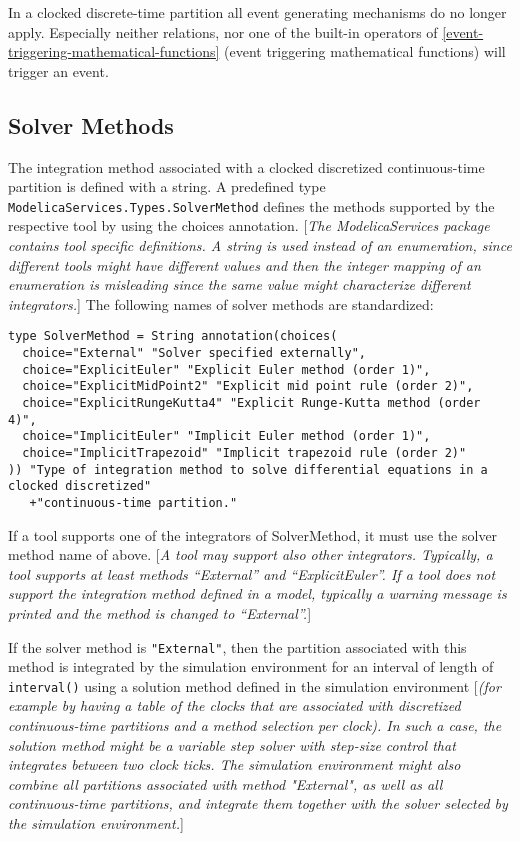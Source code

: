 In a clocked discrete-time partition all event generating mechanisms do
no longer apply. Especially neither relations, nor one of the built-in
operators of \autoref{event-triggering-mathematical-functions} (event triggering mathematical functions)
will trigger an event.

\subsection{Solver Methods}

The integration method associated with a clocked discretized
continuous-time partition is defined with a string. A predefined type
\lstinline[basicstyle=\ttfamily]!ModelicaServices.Types.SolverMethod! defines the methods supported by the
respective tool by using the choices annotation. {[}\emph{The
ModelicaServices package contains tool specific definitions. A string is
used instead of an enumeration, since different tools might have
different values and then the integer mapping of an enumeration is
misleading since the same value might characterize different
integrators.}{]} The following names of solver methods are standardized:

\begin{lstlisting}[language=modelica]
type SolverMethod = String annotation(choices(
  choice="External" "Solver specified externally",
  choice="ExplicitEuler" "Explicit Euler method (order 1)",
  choice="ExplicitMidPoint2" "Explicit mid point rule (order 2)",
  choice="ExplicitRungeKutta4" "Explicit Runge-Kutta method (order 4)",
  choice="ImplicitEuler" "Implicit Euler method (order 1)",
  choice="ImplicitTrapezoid" "Implicit trapezoid rule (order 2)"
)) "Type of integration method to solve differential equations in a clocked discretized"
   +"continuous-time partition."
\end{lstlisting}

If a tool supports one of the integrators of SolverMethod, it must use
the solver method name of above. {[}\emph{A tool may support also other
integrators. Typically, a tool supports at least methods ``External''
and ``ExplicitEuler''. If a tool does not support the integration method
defined in a model, typically a warning message is printed and the
method is changed to ``External''.}{]}

If the solver method is \lstinline[basicstyle=\ttfamily]!"External"!, then the partition associated with
this method is integrated by the simulation environment for an interval
of length of \lstinline[basicstyle=\ttfamily]!interval()! using a solution method defined in the
simulation environment {[}\emph{(for example by having a table of the
clocks that are associated with discretized continuous-time partitions
and a method selection per clock). In such a case, the solution method
might be a variable step solver with step-size control that integrates
between two clock ticks. The simulation environment might also combine
all partitions associated with method "External", as well as all
continuous-time partitions, and integrate them together with the solver
selected by the simulation environment.}{]}

